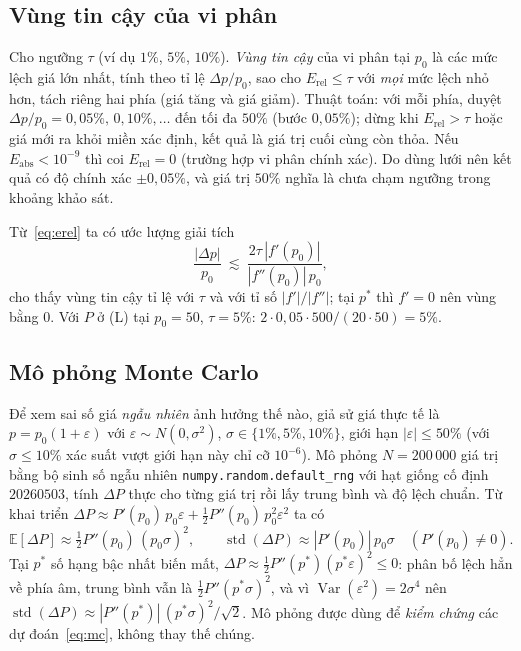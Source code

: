 \subsection{Vùng tin cậy của vi phân}
Cho ngưỡng $\tau$ (ví dụ $1\%$, $5\%$, $10\%$). \emph{Vùng tin cậy} của vi phân tại $p_0$
là các mức lệch giá lớn nhất, tính theo tỉ lệ $\Delta p/p_0$, sao cho
$E_{\mathrm{rel}}\le\tau$ với \emph{mọi} mức lệch nhỏ hơn, tách riêng hai phía (giá tăng
và giá giảm). Thuật toán: với mỗi phía, duyệt $\Delta p/p_0=0{,}05\%,\,0{,}10\%,\dots$ đến
tối đa $50\%$ (bước $0{,}05\%$); dừng khi $E_{\mathrm{rel}}>\tau$ hoặc giá mới ra khỏi
miền xác định, kết quả là giá trị cuối cùng còn thỏa. Nếu $E_{\mathrm{abs}}<10^{-9}$ thì
coi $E_{\mathrm{rel}}=0$ (trường hợp vi phân chính xác). Do dùng lưới nên kết quả có độ
chính xác $\pm0{,}05\%$, và giá trị $50\%$ nghĩa là chưa chạm ngưỡng trong khoảng khảo sát.

Từ~\eqref{eq:erel} ta có ước lượng giải tích
\begin{equation}\label{eq:safe}
\frac{|\Delta p|}{p_0}\ \lesssim\ \frac{2\tau\,|f'(p_0)|}{|f''(p_0)|\,p_0},
\end{equation}
cho thấy vùng tin cậy tỉ lệ với $\tau$ và với tỉ số $|f'|/|f''|$; tại $p^*$ thì
$f'=0$ nên vùng bằng $0$. Với $P$ ở (L) tại $p_0=50$, $\tau=5\%$:
$2\cdot0{,}05\cdot500/(20\cdot50)=5\%$.

\subsection{Mô phỏng Monte Carlo}
Để xem sai số giá \emph{ngẫu nhiên} ảnh hưởng thế nào, giả sử giá thực tế là
$p=p_0(1+\varepsilon)$ với $\varepsilon\sim N(0,\sigma^2)$, $\sigma\in\{1\%,5\%,10\%\}$, giới
hạn $|\varepsilon|\le 50\%$ (với $\sigma\le10\%$ xác suất vượt giới hạn này chỉ cỡ $10^{-6}$).
Mô phỏng $N=200\,000$ giá trị bằng bộ sinh số ngẫu nhiên \texttt{numpy.random.default\_rng}
với hạt giống cố định $20260503$, tính $\Delta P$ thực cho từng giá trị rồi lấy trung bình
và độ lệch chuẩn. Từ khai triển
$\Delta P\approx P'(p_0)\,p_0\varepsilon+\tfrac12 P''(p_0)\,p_0^2\varepsilon^2$ ta có
\begin{equation}\label{eq:mc}
\mathbb E[\Delta P]\approx \tfrac12 P''(p_0)\,(p_0\sigma)^2, \qquad
\operatorname{std}(\Delta P)\approx |P'(p_0)|\,p_0\sigma \quad (P'(p_0)\neq 0).
\end{equation}
Tại $p^*$ số hạng bậc nhất biến mất, $\Delta P\approx\tfrac12P''(p^*)(p^*\varepsilon)^2\le 0$:
phân bố lệch hẳn về phía âm, trung bình vẫn là $\tfrac12P''(p^*\sigma)^2$, và vì
$\operatorname{Var}(\varepsilon^2)=2\sigma^4$ nên
$\operatorname{std}(\Delta P)\approx |P''(p^*)|\,(p^*\sigma)^2/\sqrt2$.
Mô phỏng được dùng để \emph{kiểm chứng} các dự đoán~\eqref{eq:mc}, không thay thế chúng.

